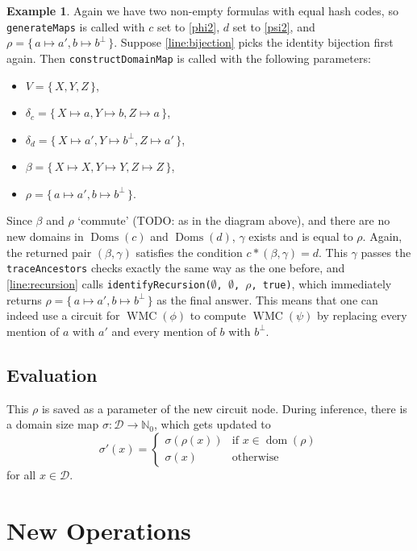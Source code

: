 \documentclass{article}
\theoremstyle{definition}
\newtheorem{example}{Example}
\DeclareMathOperator{\dom}{dom}
\DeclareMathOperator{\Doms}{Doms}
\DeclareMathOperator{\WMC}{WMC}
\begin{document}
\begin{example}
  Again we have two non-empty formulas with equal hash codes, so \texttt{generateMaps} is called with $c$ set to \cref{phi2}, $d$ set to \cref{psi2}, and $\rho = \{\, a \mapsto a', b \mapsto b^\bot \,\}$. Suppose \cref{line:bijection} picks the identity bijection first again. Then \texttt{constructDomainMap} is called with the following parameters:
  \begin{itemize}
  \item $V = \{\, X, Y, Z \,\}$,
  \item $\delta_c = \{\, X \mapsto a, Y \mapsto b, Z \mapsto a \,\}$,
  \item $\delta_d = \{\, X \mapsto a', Y \mapsto b^\bot, Z \mapsto a' \,\}$,
  \item $\beta = \{\, X \mapsto X, Y \mapsto Y, Z \mapsto Z \,\}$,
  \item $\rho = \{\, a \mapsto a', b \mapsto b^\bot \,\}$.
  \end{itemize}
  Since $\beta$ and $\rho$ `commute' (TODO: as in the diagram above), and there are no new domains in $\Doms(c)$ and $\Doms(d)$, $\gamma$ exists and is equal to $\rho$. Again, the returned pair $(\beta, \gamma)$ satisfies the condition $c \ast (\beta, \gamma) = d$. This $\gamma$ passes the \texttt{traceAncestors} checks exactly the same way as the one before, and \cref{line:recursion} calls \texttt{identifyRecursion($\emptyset$, $\emptyset$, $\rho$, true)}, which immediately returns $\rho = \{\, a \mapsto a', b \mapsto b^\bot \,\}$ as the final answer. This means that one can indeed use a circuit for $\WMC(\phi)$ to compute $\WMC(\psi)$ by replacing every mention of $a$ with $a'$ and every mention of $b$ with $b^\bot$.
\end{example}

\subsection{Evaluation}

This $\rho$ is saved as a parameter of the new circuit node. During inference, there is a domain size map $\sigma\colon \mathscr{D} \to \mathbb{N}_0$, which gets updated to
\[
\sigma'(x) =
\begin{cases}
  \sigma(\rho(x)) & \text{if } x \in \dom(\rho) \\
  \sigma(x) & \text{otherwise}
\end{cases}
\]
for all $x \in \mathscr{D}$.

\section{New Operations}
\end{document}
